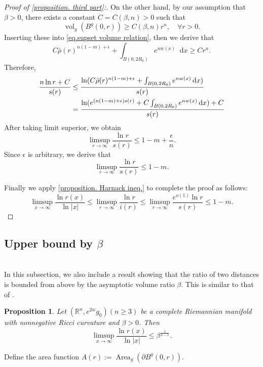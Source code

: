 \documentclass[10pt,a4paper]{amsart}
\newtheorem{proposition}[theorem]{Proposition}
\numberwithin{equation}{section}
\newcommand{\dx}{\mathop{}\!\mathrm{d}x}
\begin{document}
\begin{proof}[Proof of \cref{proposition. third part}:]
    On the other hand, by our assumption that $\beta>0$, there exists a constant $C=C(\beta,n)>0$ such that
    \[
        \operatorname{vol}_g(B^g(0,r))\geq C(\beta,n)r^n,\quad \forall r>0.
    \]
    Inserting these into \cref{eq.supset volume relation}, then we derive that
    \[
        C\bar{\rho}(r)^{n(1-m)+\epsilon}
        +\int_{B(0,2R_0)}
        e^{nw(x)}\dx
        \geq C r^n.
    \]
    Therefore,
    \begin{align*}
        \frac{n\ln r+C}{s(r)}&\leq \frac{\ln(C\bar{\rho}(r)^{n(1-m)+\epsilon}+\int_{B(0,2R_0)}
        e^{nw(x)}\dx)}{s(r)} \\ \notag
        &=\frac{\ln (e^{(n(1-m)+\epsilon)s(r) }+C\int_{B(0,2R_0)}
        e^{nw(x)}\dx)+C}{s(r)}
    \end{align*}
    After taking limit superior, we obtain
    \[
        \limsup_{r\to \infty}\frac{\ln r}{s(r)}
        \leq 1-m+\frac{\epsilon}{n}.
    \]
    Since $\epsilon$ is arbitrary, we derive that
    \[
        \limsup_{r\to \infty}\frac{\ln r}{s(r)}
        \leq 1-m.
    \]

    Finally we apply \cref{proposition. Harnack ineq.} to complete the proof as follows:
    \[
        \limsup_{x\to\infty}\frac{\ln r(x)}{\ln |x|}\leq 
        \limsup_{r\to \infty}\frac{\ln r}{i(r)}
        \leq \limsup_{r\to \infty}\frac{e^{o(1)}\ln r}{s(r)}
        \leq 1-m.
    \]
\end{proof}

\subsection{Upper bound by $\beta$ }
\ \\
In this subsection, we also include a result showing that the ratio of two distances is bounded from above by the asymptotic volume ratio $\beta$. This is similar to that of \cite[Theorem 2.5]{LT2}.

\begin{proposition}\label{proposition. first part}
    Let $(\mathbb{R}^n,e^{2w}g_0) (n\geq 3)$ be a complete Riemannian manifold with nonnegative Ricci curvature and  $\beta>0$.
    Then 
    \[
        \limsup_{x\to \infty}\frac{\ln r(x)}{\ln |x|}\leq \beta^{\frac{1}{n-1}}.
    \]
\end{proposition}

 Define the area function  
$A(r):=\operatorname{Area}_g(\partial B^g(0,r)).$
\end{document}
